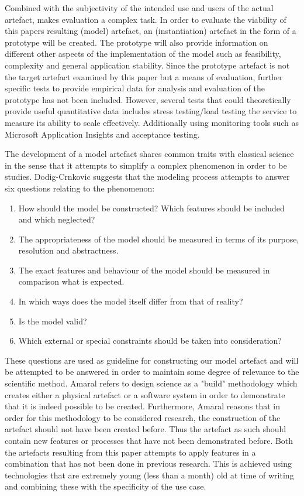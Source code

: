 Combined with the subjectivity of the intended use and users of the actual artefact, makes evaluation a complex task. In order to evaluate the viability of this papers resulting (model) artefact, an (instantiation) artefact in the form of a prototype will be created. The prototype will also provide information on different other aspects of the implementation of the model such as feasibility, complexity and general application stability. Since the prototype artefact is not the target artefact examined by this paper but a means of evaluation, further specific tests to provide empirical data for analysis and evaluation of the prototype has not been included. However, several tests that could theoretically provide useful quantitative data includes stress testing/load testing the service to measure its ability to scale effectively. Additionally using monitoring tools such as Microsoft Application Insights \cite{AppINsight} and acceptance testing.

 
The development of a model artefact shares common traits with classical science in the sense that it attempts to simplify a complex phenomenon in order to be studies. Dodig-Crnkovic \cite{Dodig-crnkovic} suggests that the modeling process attempts to answer six questions relating to the phenomenon:

\begin{enumerate}
\item How should the model be constructed? Which features should be included and which neglected?
\item The appropriateness of the model should be measured in terms of its purpose, resolution and abstractness.
\item The exact features and behaviour of the model should be measured in comparison what is expected.
\item In which ways does the model itself differ from that of reality?
\item Is the model valid?
\item Which external or special constraints should be taken into consideration?
\end{enumerate}

These questions are used as guideline for constructing our model artefact and will be attempted to be answered in order to maintain some degree of relevance to the scientific method. Amaral \cite{Amaral2011} refers to design science as a "build" methodology which creates either a physical artefact or a software system in order to demonstrate that it is indeed possible to be created. Furthermore, Amaral reasons that in order for this methodology to be considered research, the construction of the artefact should not have been created before. Thus the artefact as such should contain new features or processes that have not been demonstrated before. Both the artefacts resulting from this paper attempts to apply features in a combination that has not been done in previous research. This is achieved using technologies that are extremely young (less than a month) old at time of writing and combining these with the specificity of the use case.


